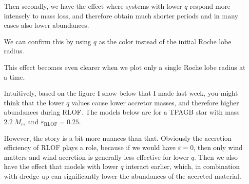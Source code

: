 \documentclass[a4paper,10pt]{article}
\begin{document}
Then secondly, we have the effect where systems with lower \(q\) respond more intensely to mass loss,
and therefore obtain much shorter periods and in many cases also lower abundances.

We can confirm this by using \(q\) as the color instead of the initial Roche lobe radius.

\begin{figure}[ht]
	\centering
\end{figure}

\nextpage
This effect becomes even clearer when we plot only a single Roche lobe radius at a time.
\begin{figure}[ht]
	\centering
\end{figure}

Intuitively, based on the figure I show below that I made last week, you might think that
the lower \(q\) values cause lower accretor masses, and therefore higher abundances during RLOF.
The models below are for a TPAGB star with mass \(2.2\; M_\odot \) and \(\varepsilon_\text{RLOF} = 0.25\).

\begin{figure}[ht]
	\centering
\end{figure}

However, the story is a bit more nuances than that.
Obviously the accretion efficiency of RLOF plays a role, because if we would have \(\varepsilon = 0\), then
only wind matters and wind accretion is generally less effective for lower \(q\).
Then we also have the effect that models with lower \(q\) interact
earlier, which, in combination with dredge up can significantly lower the abundances of the accreted material.
\end{document}
